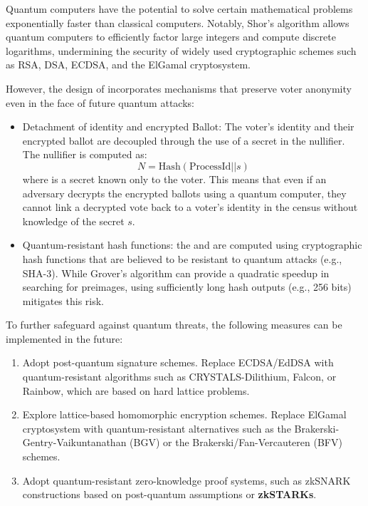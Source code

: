 Quantum computers have the potential to solve certain mathematical problems exponentially faster than classical computers. Notably, Shor's algorithm allows quantum computers to efficiently factor large integers and compute discrete logarithms, undermining the security of widely used cryptographic schemes such as RSA, DSA, ECDSA, and the ElGamal cryptosystem.

However, the design of \davinci incorporates mechanisms that preserve voter anonymity even in the face of future quantum attacks:

\begin{itemize}
	\item Detachment of identity and encrypted Ballot: The voter's identity and their encrypted ballot are decoupled through the use of a secret in the nullifier. The nullifier is computed as:
	$$ N = \text{Hash}(\text{ProcessId} || s) $$	
	where is a secret known only to the voter. This means that even if an adversary decrypts the encrypted ballots using a quantum computer, they cannot link a decrypted vote back to a voter's identity in the census without knowledge of the secret $s$.
	\item Quantum-resistant hash functions: the \nullifier and \commitment are computed using cryptographic hash functions that are believed to be resistant to quantum attacks (e.g., SHA-3). While Grover's algorithm can provide a quadratic speedup in searching for preimages, using sufficiently long hash outputs (e.g., 256 bits) mitigates this risk.
\end{itemize}

To further safeguard against quantum threats, the following measures can be implemented in the future:

\begin{enumerate}
	\item Adopt post-quantum signature schemes. Replace ECDSA/EdDSA with quantum-resistant algorithms such as CRYSTALS-Dilithium, Falcon, or Rainbow, which are based on hard lattice problems.
	
	\item Explore lattice-based homomorphic encryption schemes. Replace ElGamal cryptosystem with quantum-resistant alternatives such as the Brakerski-Gentry-Vaikuntanathan (BGV) or the Brakerski/Fan-Vercauteren (BFV) schemes.
	
	\item Adopt quantum-resistant zero-knowledge proof systems, such as zkSNARK constructions based on post-quantum assumptions or \textbf{zkSTARKs}.
\end{enumerate}

